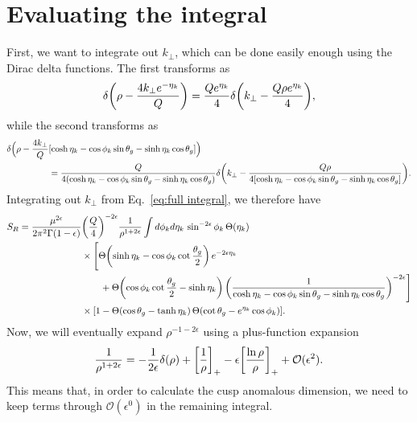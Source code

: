 \documentclass[11pt,twoside,reqno]{amsart}
\theoremstyle{plain}
\theoremstyle{remark}
\theoremstyle{definition}
\theoremstyle{remark}
\theoremstyle{definition}
\theoremstyle{definition}
\newcommand{\cO}{\mathcal{O}}
\begin{document}
\section{Evaluating the integral}
	First, we want to integrate out $k_\perp$, which can be done easily enough using the Dirac delta functions. The first transforms as
	\begin{equation}
		\delta\qty(\rho - \frac{4k_\perp e^{-\eta_k}}{Q}) = \frac{Q e^{\eta_k}}{4} \delta\qty(k_\perp - \frac{Q \rho e^{\eta_k}}{4}),
	\end{equation}
	while the second transforms as
	\begin{equation}
	\begin{aligned}
		\delta\Big(\rho - \frac{4 k_\perp}{Q}&\qty[\cosh\eta_k - \cos\phi_k\sin\theta_g - \sinh\eta_k\cos\theta_g]\Big) \\
		&= \frac{Q}{4\qty(\cosh\eta_k - \cos\phi_k\sin\theta_g - \sinh\eta_k\cos\theta_g)} \delta\qty(k_\perp - \frac{Q \rho}{4\qty[\cosh\eta_k - \cos\phi_k\sin\theta_g - \sinh\eta_k\cos\theta_g]}).
	\end{aligned}
	\end{equation}
	Integrating out $k_\perp$ from Eq.~\ref{eq:full integral}, we therefore have
	\begin{equation}\label{eq:full integral without kperp}
	\begin{aligned}
		S_R = \frac{\mu^{2\epsilon}}{2\pi^2\Gamma(1 - \epsilon)} &\qty(\frac{Q}{4})^{-2\epsilon} \frac{1}{\rho^{1+2\epsilon}} \int d\phi_k d\eta_k\, \sin^{-2\epsilon}\phi_k \, \Theta(\eta_k) \\
		&\times \Bigg[ \Theta\qty(\sinh\eta_k - \cos\phi_k\cot\frac{\theta_g}{2})\,e^{-2\epsilon\eta_k} \\
			&\qquad+ \Theta\qty(\cos\phi_k\cot\frac{\theta_g}{2} - \sinh\eta_k)\, \qty(\frac{1}{\cosh\eta_k - \cos\phi_k\sin\theta_g - \sinh\eta_k\cos\theta_g})^{-2\epsilon}\Bigg] \\
			&\times \qty[1 - \Theta(\cos\theta_g - \tanh\eta_k)\,\Theta\qty(\cot\theta_g - e^{\eta_k}\cos\phi_k)].
	\end{aligned}
	\end{equation}
	Now, we will eventually expand $\rho^{-1-2\epsilon}$ using a plus-function expansion \cite{lazopoulos_qcd_2007}
	\begin{equation}
		\frac{1}{\rho^{1+2\epsilon}} = -\frac{1}{2\epsilon}\delta(\rho) + \qty[\frac{1}{\rho}]_+ - \epsilon \qty[\frac{\ln \rho}{\rho}]_+ + \cO(\epsilon^2).
	\end{equation}
	This means that, in order to calculate the cusp anomalous dimension, we need to keep terms through $\cO(\epsilon^0)$ in the remaining integral.
\end{document}
